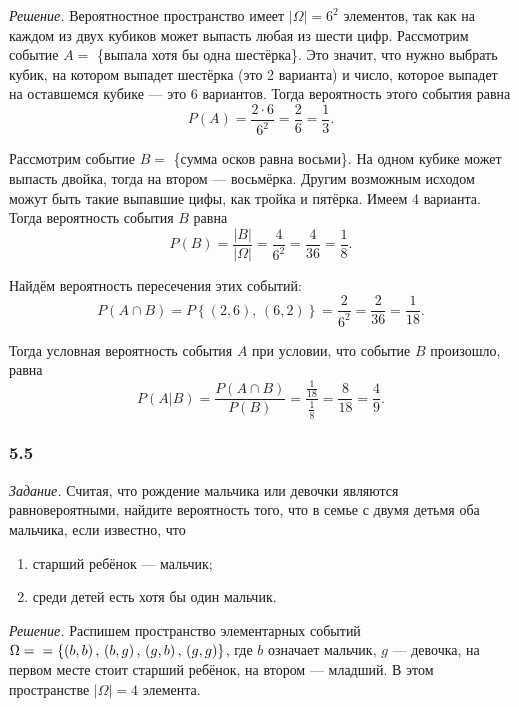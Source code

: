 \textit{Решение.}
Вероятностное пространство имеет $ \left| \Omega \right| = 6^2$ элементов, так как на каждом из двух кубиков может выпасть любая из шести цифр.
Рассмотрим событие $A =$ \{выпала хотя бы одна шестёрка\}.
Это значит, что нужно выбрать кубик, на котором выпадет шестёрка (это 2 варианта) и число, которое выпадет на оставшемся кубике --- это $6$ вариантов.
Тогда вероятность этого события равна
$$P \left( A \right) =
\frac{2 \cdot 6}{6^2} =
\frac{2}{6} =
\frac{1}{3}.$$

Рассмотрим событие $B =$ \{сумма осков равна восьми\}.
На одном кубике может выпасть двойка, тогда на втором --- восьмёрка.
Другим возможным исходом можут быть такие выпавшие цифы, как тройка и пятёрка.
Имеем 4 варианта.
Тогда вероятность события $B$ равна
$$P \left( B \right) =
\frac{ \left| B \right| }{ \left| \Omega \right| } =
\frac{4}{6^2} =
\frac{4}{36} =
\frac{1}{8}.$$

Найдём вероятность пересечения этих событий:
$$P \left( A \cap B \right) =
P \left\{ \left( 2, 6 \right), \, \left( 6, 2 \right) \right\} =
\frac{2}{6^2} =
\frac{2}{36} =
\frac{1}{18}.$$

Тогда условная вероятность события $A$ при условии, что событие $B$ произошло, равна
$$P \left( \left. A \right| B \right) =
\frac{P \left( A \cap B \right) }{P \left( B \right) } =
\frac{ \frac{1}{18} }{ \frac{1}{8} } =
\frac{8}{18} =
\frac{4}{9}.$$

\subsubsection*{5.5}

\textit{Задание.}
Считая,
что рождение мальчика или девочки являются равновероятными, найдите вероятность того, что в семье с двумя детьмя оба мальчика, если известно, что
\begin{enumerate}[label=\alph*)]
\item старший ребёнок --- мальчик;
\item среди детей есть хотя бы один мальчик.
\end{enumerate}

\textit{Решение.}
Распишем пространство элементарных событий
$ \Omega = \\
= \left\{ \left( b, b \right), \, \left( b, g \right), \, \left( g, b \right), \, \left( g, g \right) \right\} $,
где $b$ означает мальчик, $g$ --- девочка, на первом месте стоит старший ребёнок, на втором --- младший.
В этом пространстве $ \left| \Omega \right| = 4$ элемента.

